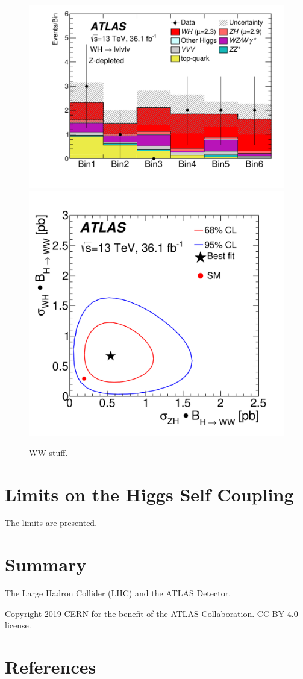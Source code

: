 \documentclass{moriond}
\begin{document}
\begin{figure}[!htbp]
\centering
\includegraphics[width=0.55\linewidth]{figures/HIGG-2017-14/fig_06b.pdf}
\includegraphics[width=0.44\linewidth]{figures/HIGG-2017-14/fig_08.pdf}
\caption{
  WW stuff.
}
\label{fig:vh_bb}
\end{figure}

\section{Limits on the Higgs Self Coupling} \label{sec:hh}

The limits are presented.

\section{Summary}

The Large Hadron Collider (LHC) \cite{Evans:2008zzb} and the ATLAS Detector.

Copyright 2019 CERN for the benefit of the ATLAS Collaboration. CC-BY-4.0 license.

\section*{References}


\end{document}
